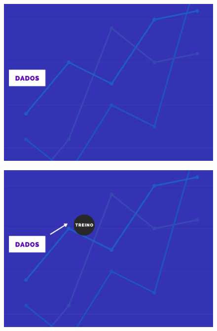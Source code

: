 \documentclass[compress]{beamer}
\begin{document}

\begin{frame}{}
    \begin{figure}
        \centering
        \includegraphics[scale=.39]{img/1.png}
    \end{figure}
\end{frame}
\begin{frame}{}
    \begin{figure}
        \centering
        \includegraphics[scale=.39]{img/2.png}
    \end{figure}
\end{frame}
\end{document}
